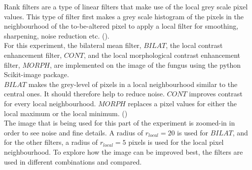 Rank filters are a type of linear filters that make use of the local grey scale pixel values. This type of filter first makes a grey scale histogram of the pixels in the neighbourhood of the to-be-altered pixel to apply a local filter for smoothing, sharpening, noise reduction etc. (\cite{rank}).\\
For this experiment, the bilateral mean filter, $BILAT$, the local contrast enhancement filter, $CONT$, and the local morphological contrast enhancement filter, $MORPH$, are implemented on the image of the fungus using the python Scikit-image package.\\
$BILAT$ makes the grey-level of pixels in a local neighbourhood similar to the central ones. It should therefore help to reduce noise. $CONT$ improves contrast for every local neighbourhood. $MORPH$ replaces a pixel values for either the local maximum or the local minimum. (\cite{rank})\\
The image that is being used for this part of the experiment is zoomed-in in order to see noise and fine details. A radius of $r_{local} = 20$ is used for $BILAT$, and for the other filters, a radius of $r_{local} = 5$ pixels is used for the local pixel neighbourhood. To explore how the image can be improved best, the filters are used in different combinations and compared.
\clearpage

